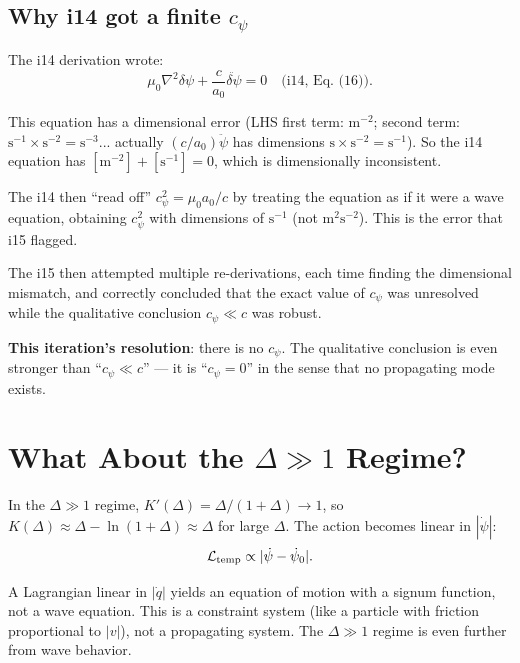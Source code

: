 \documentclass[11pt]{article}
\begin{document}
\subsection{Why i14 got a finite $c_\psi$}

The i14 derivation wrote:
\begin{equation}
\mu_0\nabla^2\delta\psi + \frac{c}{a_0}\ddot{\delta\psi} = 0 \quad \text{(i14, Eq.~(16))}.
\end{equation}

This equation has a dimensional error (LHS first term: $\text{m}^{-2}$; second term: $\text{s}^{-1} \times \text{s}^{-2} = \text{s}^{-3}$... actually $(c/a_0)\ddot\psi$ has dimensions $\text{s} \times \text{s}^{-2} = \text{s}^{-1}$). So the i14 equation has $[\text{m}^{-2}] + [\text{s}^{-1}] = 0$, which is dimensionally inconsistent.

The i14 then ``read off'' $c_\psi^2 = \mu_0 a_0/c$ by treating the equation as if it were a wave equation, obtaining $c_\psi^2$ with dimensions of $\text{s}^{-1}$ (not $\text{m}^2\text{s}^{-2}$). This is the error that i15 flagged.

The i15 then attempted multiple re-derivations, each time finding the dimensional mismatch, and correctly concluded that the exact value of $c_\psi$ was unresolved while the qualitative conclusion $c_\psi \ll c$ was robust.

\textbf{This iteration's resolution}: there is no $c_\psi$. The qualitative conclusion is even stronger than ``$c_\psi \ll c$'' --- it is ``$c_\psi = 0$'' in the sense that no propagating mode exists.


\section{What About the $\Delta \gg 1$ Regime?}

In the $\Delta \gg 1$ regime, $K'(\Delta) = \Delta/(1+\Delta) \to 1$, so $K(\Delta) \approx \Delta - \ln(1+\Delta) \approx \Delta$ for large $\Delta$. The action becomes linear in $|\dot\psi|$:
\begin{equation}
\mathcal{L}_{\rm temp} \propto |\dot\psi - \dot\psi_0|.
\end{equation}

A Lagrangian linear in $|\dot q|$ yields an equation of motion with a signum function, not a wave equation. This is a constraint system (like a particle with friction proportional to $|v|$), not a propagating system. The $\Delta \gg 1$ regime is even further from wave behavior.
\end{document}
